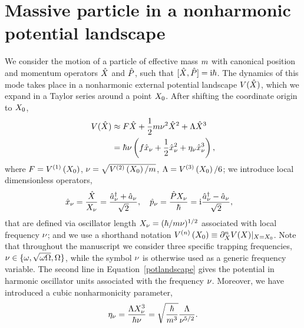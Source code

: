 \documentclass[reprint,prx,footinbib,floatfix,twocolumn,longbibliography,superscriptaddress]{revtex4-2}
\begin{document}
\section{Massive particle in a nonharmonic potential landscape}
\label{sec_mass}
We consider the motion of a particle of effective mass $m$ with canonical position and momentum operators $\hat{X}$ and $\hat{P}$, such that $[\hat{X}, \hat{P} ] = \text{i} \hbar$.
The dynamics of this mode takes place in a nonharmonic external potential landscape $V (\hat{X})$, which we expand in a Taylor series around a point $X_0$.
After shifting the coordinate origin to $X_0$,
\begin{align}
    V (\hat{X}) & \approx F \hat{X} + \frac{1}{2}m \nu^2 \hat{X}^2 + \Lambda \hat{X}^3 \nonumber \\
    & = \hbar \nu \left( f \hat{x}_{\nu} + \frac{1}{2} \hat{x}_{\nu}^2 +  \eta_{\nu} \hat{x}_{\nu}^3  \right),
    \label{potlandscape}
\end{align}
where $F = V^{(1)} \left( X_0 \right)$, $\nu = \sqrt{ V^{(2)} \left( X_0 \right) / m}$, $\Lambda  = V^{(3)} \left( X_0 \right)/6$; we introduce local dimensionless operators, 
\begin{align}
    \PosOp_{\UnFreq} &= \frac{\PositionOperator}{  \PosDim_{\UnFreq}} = \frac{\Creation_{\UnFreq}+\Annihilation_{\UnFreq}}{\sqrt{2}}\nonumber, \ \ \ \MomOp_{\UnFreq} =  \frac{\MomentumOperator   \PosDim_{\UnFreq}} { \hbar }= \ImagUnit  \frac{\Creation_{\UnFreq}-\Annihilation_{\UnFreq}}{\sqrt{2}},
\end{align}
that are defined via oscillator length $X_{\nu} = (\hbar / m \nu)^{1/2}$ associated with local frequency $\nu$; and we use a shorthand notation $V^{(n)} \left( X_0 \right) \equiv \partial_{X}^nV(X)|_{X = X_0 }$.
Note that throughout the manuscript we consider three specific trapping frequencies, $\nu \in \{\omega,\sqrt{\omega\Omega},\Omega\}$, while the symbol $\nu$ is otherwise used as a generic frequency variable.
The second line in Equation~\eqref{potlandscape} gives the potential in harmonic oscillator units associated with the frequency $\nu$.
Moreover, we have introduced a cubic nonharmonicity parameter,
\begin{align}
    \eta_{\nu} = \frac{\Lambda X_{\nu}^3  }{ \hbar \nu} = \sqrt{\frac{\hbar}{m^3}} \frac{\Lambda}{\nu^{5/2}}.
    \label{nonlinpar}
\end{align}
\end{document}
